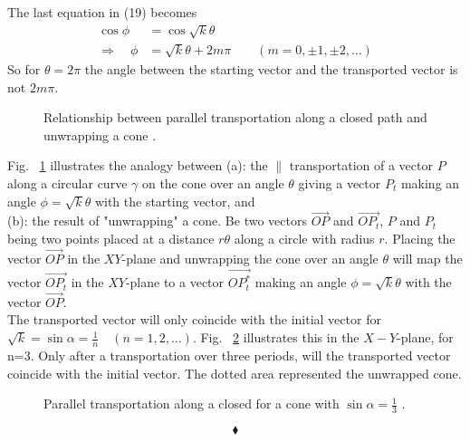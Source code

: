 The last equation in (19) becomes
\begin{align}
\cos{\phi} &= \cos{\sqrt{k}\theta} \\
\Rightarrow \quad \phi &= \sqrt{k}\theta + 2m\pi\quad\quad (m= 0,\pm 1,\pm 2, \dots)
\end{align}
So for $\theta = 2\pi$ the angle between the starting vector and the transported vector is not $2m\pi$. 
\begin{figure}[H]%
    \centering
    \subfloat[]{}
	\qquad
    \subfloat[]{}
\caption{Relationship between parallel transportation along a closed path and unwrapping a cone .}
\label{fig:fig_p108_Ex2_b2}
\end{figure}
Fig. ~\ref{fig:fig_p108_Ex2_b2} illustrates the analogy between 
(a): the $\parallel$ transportation of a vector $P$ along a circular curve $\gamma$ on the cone over an angle $\theta$ giving a vector $P_t$ making an angle $\phi = \sqrt{k}\theta$ with the starting vector, and \\
(b): the result of "unwrapping" a cone. Be two vectors $\overrightarrow{OP}$ and $\overrightarrow{OP_t}$, $P$ and $P_t$ being two points placed at a distance $r\theta$ along a circle  with radius $r$. Placing the vector $\overrightarrow{OP}$ in the $XY$-plane and unwrapping the cone over an angle $\theta$ will map the vector $\overrightarrow{OP_t}$ in the $XY$-plane to a vector $\overrightarrow{OP_t^{*}}$ making an angle $\phi = \sqrt{k}\theta$ with the vector $\overrightarrow{OP}$.\\
The transported vector will only coincide with the initial vector for $\sqrt{k}=\sin{\alpha}  = \frac{1}{n}\quad (n= 1, 2, \dots)$. Fig. ~\ref{fig:fig_p108_Ex2_b3} illustrates this in the $X-Y$-plane,  for n=3. Only after a transportation over three periods, will the transported vector coincide with the initial vector. The dotted area represented the unwrapped cone.
\begin{figure}[H]%
    \centering
{}
\caption{Parallel transportation along a closed for a cone with $\sin{\alpha}  = \frac{1}{3}$ .}
\label{fig:fig_p108_Ex2_b3}
\end{figure}
$$\blacklozenge$$
\newpage